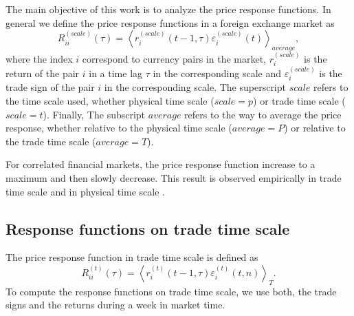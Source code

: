 The main objective of this work is to analyze the price response functions. In
general we define the price response functions in a foreign exchange market as
\begin{equation}\label{eq:response_general}
    R^{\left(scale\right)}_{ii}\left(\tau\right)=\left\langle
    r^{\left(scale\right)}_{i}\left(t-1, \tau\right)
    \varepsilon^{\left(scale\right)}_{i} \left(t\right)\right\rangle_{average},
\end{equation}
where the index $i$ correspond to currency pairs in the market,
$r^{\left(scale\right)}_{i}$ is the return of the pair $i$ in a time lag $\tau$
in the corresponding scale and $\varepsilon^{\left(scale\right)}_{i}$ is the
trade sign of the pair $i$ in the corresponding scale. The superscript $scale$
refers to the time scale used, whether physical time scale
($scale = p$) or trade time scale ($scale = t$). Finally, The subscript
$average$ refers to the way to average the price response, whether relative to
the physical time scale ($average = P$) or relative to the trade time scale
($average = T$).

For correlated financial markets, the price response function increase to a
maximum and then slowly decrease. This result is observed empirically in trade
time scale and in physical time scale
\cite{my_paper_response_financial,Wang_2016_avg}.

\subsection{Response functions on trade time scale}
\label{subsec:response_function_trade}

The price response function in trade time scale is defined as
\cite{my_paper_response_financial}
\begin{equation}\label{eq:response_functions_trade_scale_general}
    R^{\left(t\right)}_{ii}\left(\tau\right)=\left\langle r^{\left(t\right)}
    _{i}\left(t-1,\tau \right)\varepsilon_{i}^{\left(t\right)}
    \left(t, n\right)\right\rangle _{T}.
\end{equation}
To compute the response functions on trade time scale, we use both, the trade
signs and the returns during a week in market time.

